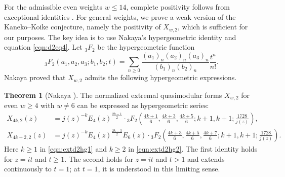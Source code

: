 \documentclass[10pt,reqno]{amsproc}
\newcommand{\1}{\mathds{1}}	%
\theoremstyle{definition}
\newtheorem{theorem}{Theorem}[section]
\theoremstyle{remark}
\begin{document}
For the admissible even weights $w \leq 14$, complete positivity follows from exceptional identities \cite[Proposition 4.6]{lee2024algebraic}.
For general weights, we prove a weak version of the Kaneko--Koike conjecture, namely the positivity of $X_{w,2}$, which is sufficient for our purposes.
The key idea is to use Nakaya's hypergeometric identity \cite{nakaya2024determination} and equation \eqref{eqn:d2eq4}.
Let ${}_{3}F_{2}$ be the hypergeometric function
\begin{equation}
    {}_{3}F_{2}(a_1, a_2, a_3; b_1, b_2; t) = \sum_{n \ge 0} \frac{(a_1)_n (a_2)_n (a_3)_n}{(b_1)_n (b_2)_n} \frac{t^n}{n!}.
\end{equation}
Nakaya proved that $X_{w, 2}$ admits the following hypergeometric expressions.
\begin{theorem}[Nakaya {\cite[Proposition 6.1]{nakaya2024determination}}]
\label{thm:extd2nakaya}
The normalized extremal quasimodular forms $X_{w, 2}$ for even $w \geq 4$ with $w \neq 6$ can be expressed as hypergeometric series:
\begin{align}
    X_{4k, 2}(z) &= j(z)^{-k} E_4(z)^{\frac{2k - 1}{2}} \cdot {}_{3}F_{2}\left(\frac{4k + 1}{6}, \frac{4k+3}{6}, \frac{4k+5}{6}; k+1, k+1; \frac{1728}{j(z)}\right) \label{eqn:extd2hg1}, \\
    X_{4k+2, 2}(z) &= j(z)^{-k} E_4(z)^{\frac{2k - 3}{2}} E_6(z) \cdot {}_{3}F_{2}\left(\frac{4k+3}{6}, \frac{4k+5}{6}, \frac{4k+7}{6}; k+1, k+1; \frac{1728}{j(z)}\right). \label{eqn:extd2hg2}
\end{align}
Here $k \geq 1$ in \eqref{eqn:extd2hg1} and $k \geq 2$ in \eqref{eqn:extd2hg2}. The first identity holds for $z=it$ and $t \geq 1$. The second holds for $z=it$ and $t>1$ and extends continuously to $t=1$; at $t=1$, it is understood in this limiting sense.
\end{theorem}
\end{document}
